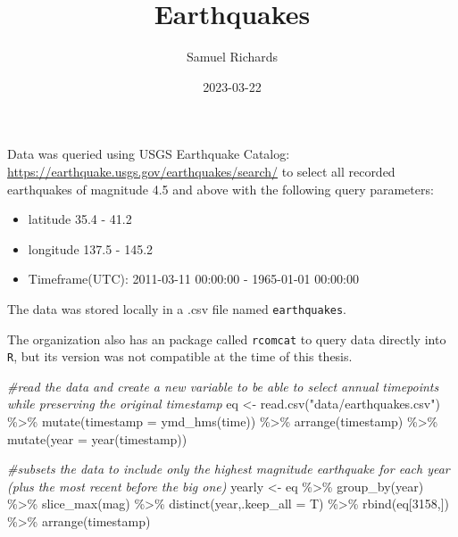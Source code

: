 \documentclass[
]{article}
\title{Earthquakes}
\author{Samuel Richards}
\date{2023-03-22}
\newenvironment{Shaded}{\begin{snugshade}}{\end{snugshade}}
\newcommand{\AttributeTok}[1]{\textcolor[rgb]{0.77,0.63,0.00}{#1}}
\newcommand{\CommentTok}[1]{\textcolor[rgb]{0.56,0.35,0.01}{\textit{#1}}}
\newcommand{\DecValTok}[1]{\textcolor[rgb]{0.00,0.00,0.81}{#1}}
\newcommand{\FunctionTok}[1]{\textcolor[rgb]{0.00,0.00,0.00}{#1}}
\newcommand{\NormalTok}[1]{#1}
\newcommand{\OtherTok}[1]{\textcolor[rgb]{0.56,0.35,0.01}{#1}}
\newcommand{\SpecialCharTok}[1]{\textcolor[rgb]{0.00,0.00,0.00}{#1}}
\newcommand{\StringTok}[1]{\textcolor[rgb]{0.31,0.60,0.02}{#1}}
\providecommand{\tightlist}{%
  \setlength{\itemsep}{0pt}\setlength{\parskip}{0pt}}
\begin{document}
\maketitle

Data was queried using USGS Earthquake Catalog:
\url{https://earthquake.usgs.gov/earthquakes/search/} to select all
recorded earthquakes of magnitude 4.5 and above with the following query
parameters:

\begin{itemize}
\tightlist
\item
  latitude 35.4 - 41.2
\item
  longitude 137.5 - 145.2
\item
  Timeframe(UTC): 2011-03-11 00:00:00 - 1965-01-01 00:00:00
\end{itemize}

The data was stored locally in a .csv file named \texttt{earthquakes}.

The organization also has an package called \texttt{rcomcat} to query
data directly into \texttt{R}, but its version was not compatible at the
time of this thesis.

\begin{Shaded}
\begin{Highlighting}[]
\CommentTok{\#read the data and create a new variable to be able to select annual timepoints while preserving the original timestamp}
\NormalTok{eq }\OtherTok{\textless{}{-}} \FunctionTok{read.csv}\NormalTok{(}\StringTok{"data/earthquakes.csv"}\NormalTok{) }\SpecialCharTok{\%\textgreater{}\%} 
  \FunctionTok{mutate}\NormalTok{(}\AttributeTok{timestamp =} \FunctionTok{ymd\_hms}\NormalTok{(time)) }\SpecialCharTok{\%\textgreater{}\%} 
  \FunctionTok{arrange}\NormalTok{(timestamp) }\SpecialCharTok{\%\textgreater{}\%} 
  \FunctionTok{mutate}\NormalTok{(}\AttributeTok{year =} \FunctionTok{year}\NormalTok{(timestamp))}


\CommentTok{\#subsets the data to include only the highest magnitude earthquake for each year (plus the most recent before the big one)}
\NormalTok{yearly }\OtherTok{\textless{}{-}}\NormalTok{ eq }\SpecialCharTok{\%\textgreater{}\%} \FunctionTok{group\_by}\NormalTok{(year) }\SpecialCharTok{\%\textgreater{}\%} 
  \FunctionTok{slice\_max}\NormalTok{(mag) }\SpecialCharTok{\%\textgreater{}\%} 
  \FunctionTok{distinct}\NormalTok{(year,}\AttributeTok{.keep\_all =}\NormalTok{ T) }\SpecialCharTok{\%\textgreater{}\%} 
  \FunctionTok{rbind}\NormalTok{(eq[}\DecValTok{3158}\NormalTok{,]) }\SpecialCharTok{\%\textgreater{}\%} 
  \FunctionTok{arrange}\NormalTok{(timestamp)}
\end{Highlighting}
\end{Shaded}
\end{document}
